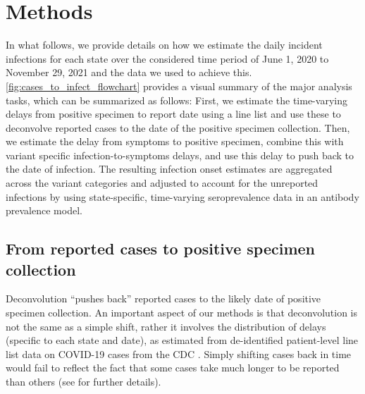 \section{Methods}
\label{sec:methods}


In what follows, we provide details on how we estimate the daily incident
infections for each state over the considered time period of June 1, 2020 to
November 29, 2021 and the data we used to achieve this.
\autoref{fig:cases_to_infect_flowchart} provides a visual summary of the major
analysis tasks, which can be summarized as follows: First, we estimate the
time-varying delays from positive specimen to report date using a line list and
use these to deconvolve reported cases to the date of the positive specimen
collection. Then, we estimate the delay from symptoms to positive specimen,
combine this with variant specific infection-to-symptoms delays, and use this
delay to push back to the date of infection. The resulting infection onset
estimates are aggregated across the variant categories and adjusted to account
for the unreported infections by using state-specific, time-varying
seroprevalence data in an antibody prevalence model. 

\subsection{From reported cases to positive specimen collection}
\label{sec:step1}

Deconvolution ``pushes back'' reported cases to the likely date of positive
specimen collection. An important aspect of our methods is that deconvolution is
not the same as a simple shift, rather it involves the distribution of delays
(specific to each state and date), as estimated from de-identified patient-level
line list data on COVID-19 cases from the CDC \citep{cdc2020caserestr}. Simply
shifting cases back in time would fail to reflect the fact that some cases take
much longer to be reported than others (see  for further details).

